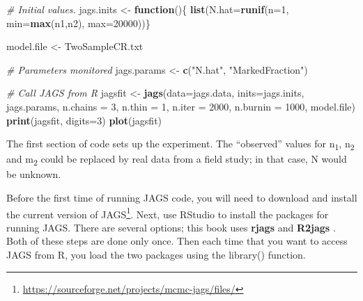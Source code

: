 \documentclass[
]{krantz}
\makeatletter
\newenvironment{Shaded}{\begin{snugshade}}{\end{snugshade}}
\newcommand{\AttributeTok}[1]{\textcolor[rgb]{0.27,0.27,0.27}{#1}}
\newcommand{\CommentTok}[1]{\textcolor[rgb]{0.37,0.37,0.37}{\textit{#1}}}
\newcommand{\ControlFlowTok}[1]{\textcolor[rgb]{0.27,0.27,0.27}{\textbf{#1}}}
\newcommand{\DecValTok}[1]{\textcolor[rgb]{0.06,0.06,0.06}{#1}}
\newcommand{\FunctionTok}[1]{\textcolor[rgb]{0.27,0.27,0.27}{\textbf{#1}}}
\newcommand{\NormalTok}[1]{#1}
\newcommand{\OtherTok}[1]{\textcolor[rgb]{0.37,0.37,0.37}{#1}}
\newcommand{\StringTok}[1]{\textcolor[rgb]{0.5,0.5,0.5}{#1}}
\renewcommand{\href}[2]{#2\footnote{\url{#1}}}
\newenvironment{kframe}{%
\medskip{}
\setlength{\fboxsep}{.8em}
 \def\at@end@of@kframe{}%
 \ifinner\ifhmode%
  \def\at@end@of@kframe{\end{minipage}}%
  \begin{minipage}{\columnwidth}%
 \fi\fi%
 \def\FrameCommand##1{\hskip\@totalleftmargin \hskip-\fboxsep
 \colorbox{shadecolor}{##1}\hskip-\fboxsep
     \hskip-\linewidth \hskip-\@totalleftmargin \hskip\columnwidth}%
 \MakeFramed {\advance\hsize-\width
   \@totalleftmargin\z@ \linewidth\hsize
   \@setminipage}}%
 {\par\unskip\endMakeFramed%
 \at@end@of@kframe}
\renewenvironment{Shaded}{\begin{kframe}}{\end{kframe}}
\makeatother
\begin{document}
\begin{Shaded}
\begin{Highlighting}[]
\CommentTok{\# Initial values.}
\NormalTok{jags.inits }\OtherTok{\textless{}{-}} \ControlFlowTok{function}\NormalTok{()\{ }\FunctionTok{list}\NormalTok{(}\AttributeTok{N.hat=}\FunctionTok{runif}\NormalTok{(}\AttributeTok{n=}\DecValTok{1}\NormalTok{, }\AttributeTok{min=}\FunctionTok{max}\NormalTok{(n1,n2), }\AttributeTok{max=}\DecValTok{20000}\NormalTok{))\}}

\NormalTok{model.file }\OtherTok{\textless{}{-}} \StringTok{\textquotesingle{}TwoSampleCR.txt\textquotesingle{}}

\CommentTok{\# Parameters monitored}
\NormalTok{jags.params }\OtherTok{\textless{}{-}} \FunctionTok{c}\NormalTok{(}\StringTok{"N.hat"}\NormalTok{, }\StringTok{"MarkedFraction"}\NormalTok{)}

\CommentTok{\# Call JAGS from R}
\NormalTok{jagsfit }\OtherTok{\textless{}{-}} \FunctionTok{jags}\NormalTok{(}\AttributeTok{data=}\NormalTok{jags.data, }\AttributeTok{inits=}\NormalTok{jags.inits, jags.params,}
                \AttributeTok{n.chains =} \DecValTok{3}\NormalTok{, }\AttributeTok{n.thin =} \DecValTok{1}\NormalTok{, }\AttributeTok{n.iter =} \DecValTok{2000}\NormalTok{, }\AttributeTok{n.burnin =} \DecValTok{1000}\NormalTok{,}
\NormalTok{                model.file)}
\FunctionTok{print}\NormalTok{(jagsfit, }\AttributeTok{digits=}\DecValTok{3}\NormalTok{)}
\FunctionTok{plot}\NormalTok{(jagsfit)}
\end{Highlighting}
\end{Shaded}

The first section of code sets up the experiment. The ``observed'' values for n\textsubscript{1}, n\textsubscript{2} and m\textsubscript{2} could be replaced by real data from a field study; in that case, N would be unknown.

Before the first time of running JAGS code, you will need to download and install the current version of \href{https://sourceforge.net/projects/mcmc-jags/files/}{JAGS}. Next, use RStudio to install the packages for running JAGS. There are several options; this book uses \textbf{rjags} \citep{R-rjags} and \textbf{R2jags} \citep{R-R2jags}. Both of these steps are done only once. Then each time that you want to access JAGS from R, you load the two packages using the library() function.
\end{document}
